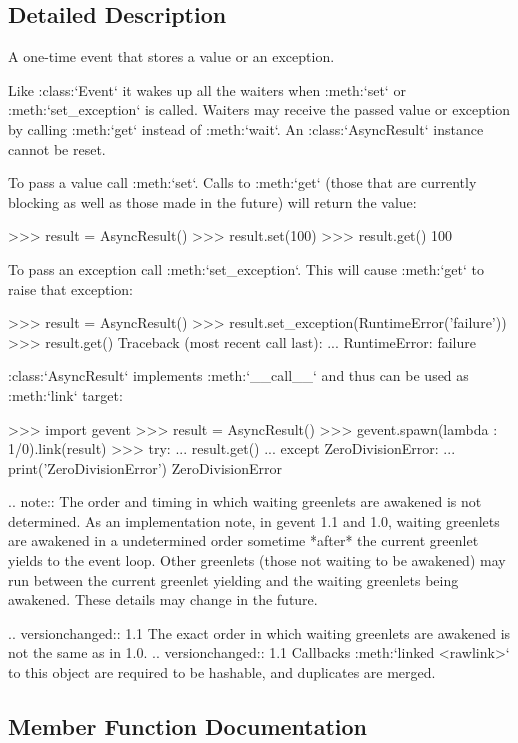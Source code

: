 \subsection{Detailed Description}
\begin{DoxyVerb}A one-time event that stores a value or an exception.

Like :class:`Event` it wakes up all the waiters when :meth:`set` or :meth:`set_exception`
is called. Waiters may receive the passed value or exception by calling :meth:`get`
instead of :meth:`wait`. An :class:`AsyncResult` instance cannot be reset.

To pass a value call :meth:`set`. Calls to :meth:`get` (those that are currently blocking as well as
those made in the future) will return the value:

    >>> result = AsyncResult()
    >>> result.set(100)
    >>> result.get()
    100

To pass an exception call :meth:`set_exception`. This will cause :meth:`get` to raise that exception:

    >>> result = AsyncResult()
    >>> result.set_exception(RuntimeError('failure'))
    >>> result.get()
    Traceback (most recent call last):
     ...
    RuntimeError: failure

:class:`AsyncResult` implements :meth:`__call__` and thus can be used as :meth:`link` target:

    >>> import gevent
    >>> result = AsyncResult()
    >>> gevent.spawn(lambda : 1/0).link(result)
    >>> try:
    ...     result.get()
    ... except ZeroDivisionError:
    ...     print('ZeroDivisionError')
    ZeroDivisionError

.. note::
    The order and timing in which waiting greenlets are awakened is not determined.
    As an implementation note, in gevent 1.1 and 1.0, waiting greenlets are awakened in a
    undetermined order sometime *after* the current greenlet yields to the event loop. Other greenlets
    (those not waiting to be awakened) may run between the current greenlet yielding and
    the waiting greenlets being awakened. These details may change in the future.

.. versionchanged:: 1.1
   The exact order in which waiting greenlets are awakened is not the same
   as in 1.0.
.. versionchanged:: 1.1
   Callbacks :meth:`linked <rawlink>` to this object are required to be hashable, and duplicates are
   merged.
\end{DoxyVerb}
 

\subsection{Member Function Documentation}
\mbox{\label{classgevent_1_1event_1_1_async_result_a09be8943a76bb5ec4982a59644005a80}} 
